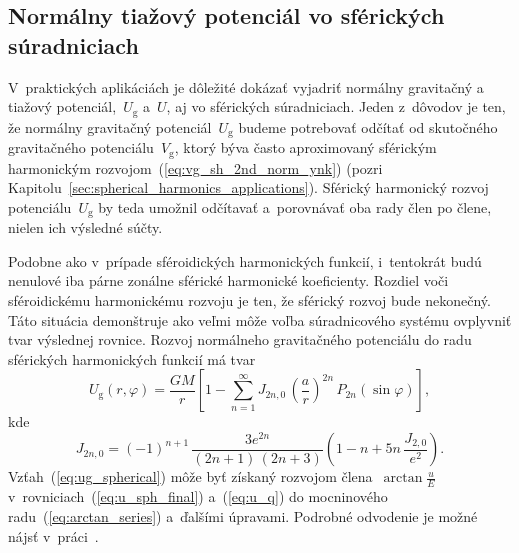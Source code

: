 \documentclass[a4paper,12pt]{book}
\newcommand{\gidx}{\mathrm g}
\begin{document}
\subsection{Normálny tiažový potenciál vo sférických súradniciach}
\label{sec:normal_gravity_potential_in_spherical_coords}

V~praktických aplikáciách je dôležité dokázať vyjadriť normálny gravitačný 
a tiažový potenciál,~$U_\gidx$ a~$U$, aj vo sférických súradniciach.  Jeden 
z~dôvodov je ten, že normálny gravitačný potenciál~$U_\gidx$ budeme potrebovať 
odčítať od skutočného gravitačného potenciálu~$V_\gidx$, ktorý býva často 
aproximovaný sférickým harmonickým rozvojom~(\ref{eq:vg_sh_2nd_norm_ynk}) 
(pozri Kapitolu~\ref{sec:spherical_harmonics_applications}).  Sférický 
harmonický rozvoj potenciálu~$U_\gidx$ by teda umožnil odčítavať a~porovnávať 
oba rady člen po člene, nielen ich výsledné súčty.

Podobne ako v~prípade sféroidických harmonických funkcií, i~tentokrát budú 
nenulové iba párne zonálne sférické harmonické koeficienty.  Rozdiel voči 
sféroidickému harmonickému rozvoju je ten, že sférický rozvoj bude nekonečný.  
Táto situácia demonštruje ako veľmi môže voľba súradnicového systému ovplyvniť 
tvar výslednej rovnice.  Rozvoj normálneho gravitačného potenciálu do radu 
sférických harmonických funkcií má tvar \parencite{Moritz1967}
%
\begin{equation}
\label{eq:ug_spherical}
U_\gidx(r, \varphi) = \frac{GM}{r} \left[ 1 - \sum_{n = 1}^{\infty} J_{2n,0} \, 
\left( \frac{a}{r} \right)^{2n} \, P_{2n}(\sin\varphi) \right]{,}
\end{equation}
%
kde
%
\begin{equation}
\label{eq:j2n0}
J_{2n,0} = (-1)^{n + 1} \, \frac{3e^{2n}}{(2n + 1) \, (2n + 3)} \left( 
1 - n + 5n \, \frac{J_{2,0}}{e^2} \right){.}
\end{equation}
%
Vzťah~(\ref{eq:ug_spherical}) môže byť získaný rozvojom 
člena~$\arctan\frac{u}{E}$ v~rovniciach~(\ref{eq:u_sph_final}) a~(\ref{eq:u_q}) 
do mocninového radu~(\ref{eq:arctan_series}) a~ďalšími úpravami.  Podrobné 
odvodenie je možné nájsť v~práci~\textcite{Moritz1967}.
\end{document}
